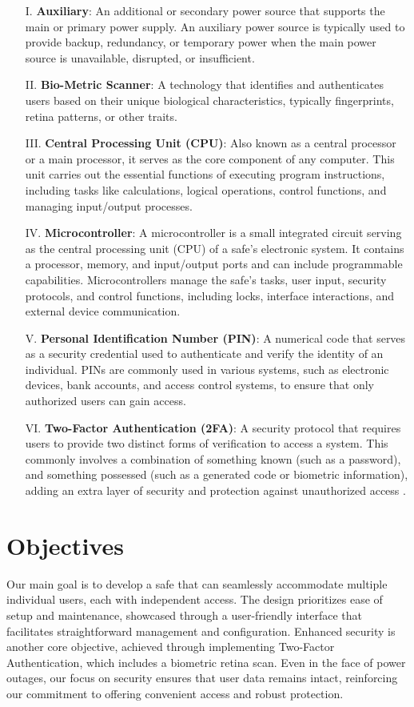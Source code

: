 \documentclass{article}
\begin{document}
\begin{enumerate}
    \item[I.] \textbf{Auxiliary}: An additional or secondary power source that supports the main or primary power supply. An auxiliary power source is typically used to provide backup, redundancy, or temporary power when the main power source is unavailable, disrupted, or insufficient.
    \item[II.] \textbf{Bio-Metric Scanner}: A technology that identifies and authenticates users based on their unique biological characteristics, typically fingerprints, retina patterns, or other traits.
    \item[III.] \textbf{Central Processing Unit (CPU)}: Also known as a central processor or a main processor, it serves as the core component of any computer. This unit carries out the essential functions of executing program instructions, including tasks like calculations, logical operations, control functions, and managing input/output processes.
    \item[IV.] \textbf{Microcontroller}: A microcontroller is a small integrated circuit serving as the central processing unit (CPU) of a safe's electronic system. It contains a processor, memory, and input/output ports and can include programmable capabilities. Microcontrollers manage the safe's tasks, user input, security protocols, and control functions, including locks, interface interactions, and external device communication.
    \item[V.] \textbf{Personal Identification Number (PIN)}: A numerical code that serves as a security credential used to authenticate and verify the identity of an individual. PINs are commonly used in various systems, such as electronic devices, bank accounts, and access control systems, to ensure that only authorized users can gain access.
    \item[VI.] \textbf{Two-Factor Authentication (2FA)}: A security protocol that requires users to provide two distinct forms of verification to access a system. This commonly involves a combination of something known (such as a password), and something possessed (such as a generated code or biometric information), adding an extra layer of security and protection against unauthorized access \cite{identityautomationTwoFactorAuthentication}.
\end{enumerate}

\section{Objectives}
Our main goal is to develop a safe that can seamlessly accommodate multiple individual users, each with independent access. The design prioritizes ease of setup and maintenance, showcased through a user-friendly interface that facilitates straightforward management and configuration. Enhanced security is another core objective, achieved through implementing Two-Factor Authentication, which includes a biometric retina scan. Even in the face of power outages, our focus on security ensures that user data remains intact, reinforcing our commitment to offering convenient access and robust protection.
\end{document}
